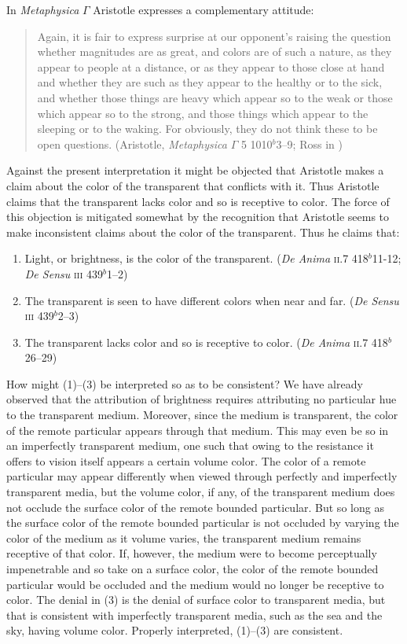\documentclass[12pt]{article}
\begin{document}
In \emph{Metaphysica} \( \Gamma \) Aristotle expresses a complementary attitude:
\begin{quote}
	Again, it is fair to express surprise at our opponent's raising the question whether magnitudes are as great, and colors are of such a nature, as they appear to people at a distance, or as they appear to those close at hand and whether they are such as they appear to the healthy or to the sick, and whether those things are heavy which appear so to the weak or those which appear so to the strong, and those things which appear to the sleeping or to the waking. For obviously, they do not think these to be open questions. (Aristotle, \emph{Metaphysica} \( \Gamma \) 5 1010\( ^{b} \)3--9; Ross in \citealt[55]{Barnes:1984kx})
\end{quote}

Against the present interpretation it might be objected that Aristotle makes a claim about the color of the transparent that conflicts with it. Thus Aristotle claims that the transparent lacks color and so is receptive to color. The force of this objection is mitigated somewhat by the recognition that Aristotle seems to make inconsistent claims about the color of the transparent. Thus he claims that:
\begin{enumerate}[(1)]
	\item Light, or brightness, is the color of the transparent. (\emph{De Anima} \textsc{ii}.7 418\( ^{b} \)11-12; \emph{De Sensu} \textsc{iii} 439\( ^{b} \)1--2)
	\item The transparent is seen to have different colors when near and far. (\emph{De Sensu} \textsc{iii} 439\( ^{b} \)2--3)
	\item The transparent lacks color and so is receptive to color. (\emph{De Anima} \textsc{ii}.7 418\( ^{b} \)26--29)
\end{enumerate}
How might (1)--(3) be interpreted so as to be consistent? We have already observed that the attribution of brightness requires attributing no particular hue to the transparent medium. Moreover, since the medium is transparent, the color of the remote particular appears through that medium. This may even be so in an imperfectly transparent medium, one such that owing to the resistance it offers to vision itself appears a certain volume color. The color of a remote particular may appear differently when viewed through perfectly and imperfectly transparent media, but the volume color, if any, of the transparent medium does not occlude the surface color of the remote bounded particular. But so long as the surface color of the remote bounded particular is not occluded by varying the color of the medium as it volume varies, the transparent medium remains receptive of that color. If, however, the medium were to become perceptually impenetrable and so take on a surface color, the color of the remote bounded particular would be occluded and the medium would no longer be receptive to color. The denial in (3) is the denial of surface color to transparent media, but that is consistent with imperfectly transparent media, such as the sea and the sky, having volume color. Properly interpreted, (1)--(3) are consistent.
\end{document}
